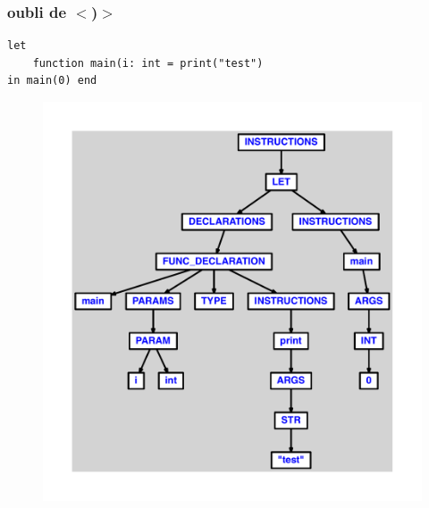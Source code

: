 \documentclass{article}
\begin{document}
\subsubsection{oubli de $ < $)$ > $}
\begin{lstlisting}
let
	function main(i: int = print("test")
in main(0) end
\end{lstlisting}
\newpage
\begin{figure}[H]
\centering
\includegraphics[max width=\textwidth]{ast/ast_220.pdf}
\end{figure}
\newpage
\end{document}
